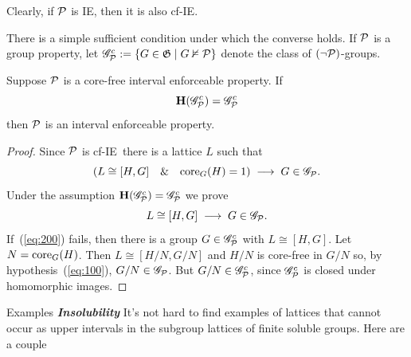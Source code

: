 \documentclass[xcolor=dvipsnames,11pt,hide notes]{beamer}
\newcommand{\defn}[1]{\textcolor{olivegreen}{\textit{\textbf{#1}}}}
\newcommand{\IE}{{\small IE}}
\theoremstyle{definition}
\theoremstyle{remark}
\numberwithin{theorem}{section}
\numberwithin{claim}{section}
\numberwithin{equation}{section}
\numberwithin{conjecture}{section}
\begin{document}
\begin{frame}[label=IEProps]{}
Clearly, if $\cP$ is IE, then it is also cf-IE.
\vskip4mm

There is a simple sufficient condition under which the converse holds.
\vskip4mm
If $\cP$ is a group property, let
$\sG_{\cP}^c := \{G\in \G \mid G\nvDash \cP\}$
denote the class of $(\neg \cP)$-groups.

\begin{lemma}
\label{lemma-wjd-2}
Suppose $\cP$ is a core-free interval enforceable property.  
If 
\[
\bH(\sG_{\cP}^c) = \sG_{\cP}^c
\]
then $\cP$ is an interval enforceable property.
\end{lemma}
\end{frame}

\begin{frame}[label=IEPropsProof]{}
\begin{proof}
Since $\cP$ is cf-\IE\ there is a lattice $L$ such that
\begin{equation}
  \label{eq:100}
\left(L \cong [H,G] \quad \& \quad \core_G(H)=1\right) \; \longrightarrow \; G\in \sG_\cP.
\end{equation}
Under the assumption $\bH(\sG_\cP^c) = \sG_\cP^c$ we prove
\begin{equation}
  \label{eq:200}
L \cong [H,G] \; \longrightarrow \; G\in \sG_\cP.
\end{equation}
If~(\ref{eq:200}) fails, then there is a
group $G\in \sG_{\cP}^c$ with $L\cong [H,G]$.  Let $N = \core_G(H)$.  Then $L \cong
[H/N,G/N]$ and $H/N$ is core-free in $G/N$ so, by hypothesis~(\ref{eq:100}),
$G/N \in \sG_\cP$.  But $G/N \in \sG_{\cP}^c$, since $\sG_{\cP}^c$ is closed under homomorphic images.
\end{proof}
\end{frame}

\begin{frame}[label=IEPropsInsoluble]{Examples}
\defn{Insolubility} 
\vskip2mm
It's not hard to find examples of lattices that cannot occur as
upper intervals in the subgroup lattices of finite soluble groups.
\vskip4mm
Here are a couple
\vskip1cm
\begin{columns}
    \begin{column}{0.2\textwidth}
        \begin{tikzpicture}[scale=.5]
          
        \end{tikzpicture}
    \end{column}
    \begin{column}{0.2\textwidth}
        \begin{tikzpicture}[scale=.5]
          
        \end{tikzpicture}
    \end{column}
\end{columns}
\end{frame}
\end{document}
